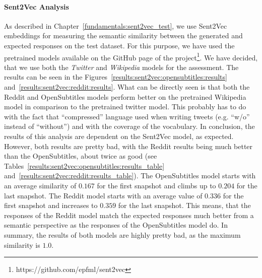 \paragraph{Sent2Vec Analysis} As described in Chapter~\ref{fundamentals:sent2vec_test}, we use Sent2Vec embeddings for measuring the semantic similarity between the generated and expected responses on the test dataset. For this purpose, we have used the pretrained models available on the GitHub page of the project\footnote{https://github.com/epfml/sent2vec}. We have decided, that we use both the \emph{Twitter} and \emph{Wikipedia} models for the assessment. The results can be seen in the Figures~\ref{results:sent2vec:opensubtitles:results} and~\ref{results:sent2vec:reddit:results}. What can be directly seen is that both the Reddit and OpenSubtitles models perform better on the pretrained Wikipedia model in comparison to the pretrained twitter model. This probably has to do with the fact that ``compressed'' language used when writing tweets (e.g. ``w/o'' instead of ``without'') and with the coverage of the vocabulary. In conclusion, the results of this analysis are dependent on the Sent2Vec model, as expected. However, both results are pretty bad, with the Reddit results being much better than the OpenSubtitles, about twice as good (see Tables~\ref{results:sent2vec:opensubtitles:results_table} and~\ref{results:sent2vec:reddit:results_table}). The OpenSubtitles model starts with an average similarity of $0.167$ for the first snapshot and climbs up to $0.204$ for the last snapshot. The Reddit model starts with an average value of $0.336$ for the first snapshot and increases to $0.359$ for the last snapshot. This means, that the responses of the Reddit model match the expected responses much better from a semantic perspective as the responses of the OpenSubtitles model do. In summary, the results of both models are highly pretty bad, as the maximum similarity is $1.0$.

